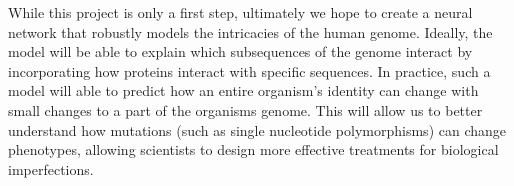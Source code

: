\documentclass{article} %
\begin{document}
While this project is only a first step, ultimately we hope to create a neural network that robustly models the intricacies of the human genome. Ideally, the model will be able to explain which subsequences of the genome interact by incorporating how proteins interact with specific sequences. In practice, such a model will able to predict how an entire organism's identity can change with small changes to a part of the organisms genome. This will allow us to better understand how mutations (such as single nucleotide polymorphisms) can change phenotypes, allowing scientists to design more effective treatments for biological imperfections.
 


\end{document}
